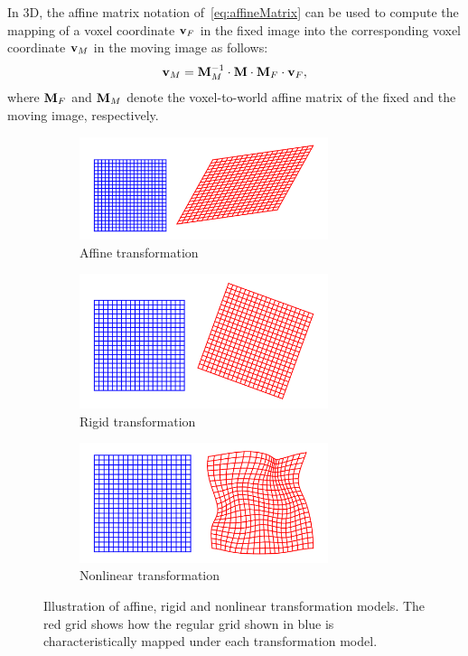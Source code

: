 \documentclass[10pt,twoside]{book}
\begin{document}
In 3D, the affine matrix notation of~\eqref{eq:affineMatrix} can be used to compute the mapping of a voxel coordinate $\mathbf{v}_F$ in the fixed image into the corresponding voxel coordinate 
$\mathbf{v}_M$ in the moving image as follows:
\begin{equation}
\mathbf{v}_M
=
\mathbf{M}_M^{-1}
\cdot
\mathbf{M}
\cdot
\mathbf{M}_F
\cdot
\mathbf{v}_F
,
\label{eq:affineVoxelToVoxel}
\end{equation}
where $\mathbf{M}_F$ and $\mathbf{M}_M$ denote the voxel-to-world affine matrix of the fixed and the moving image, respectively.

\begin{figure}
  \centering
  \begin{subfigure}{\textwidth}
     \centering
     \includegraphics[width=0.8\textwidth]{affine}
     \caption{Affine transformation}
     \label{fig:affine}
  \end{subfigure}
  \begin{subfigure}{\textwidth}
     \centering
     \includegraphics[width=0.8\textwidth]{rigid}
     \caption{Rigid transformation}
     \label{fig:rigid}
  \end{subfigure}
  \begin{subfigure}{\textwidth}
     \centering
     \includegraphics[width=0.8\textwidth]{nonlinear}
     \caption{Nonlinear transformation}
     \label{fig:nonlinear}
  \end{subfigure}
  \caption{Illustration of affine, rigid and nonlinear transformation models. The red grid shows how the regular grid shown in blue is characteristically mapped under each transformation model.}
  \label{fig:transformationModels}
\end{figure}  
\end{document}
